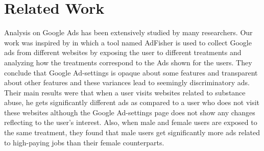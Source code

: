 \documentclass[12pt, journal]{IEEEtran}
\begin{document}
%



\section{Related Work}
Analysis on Google Ads has been extensively studied by many researchers. Our work was inspired by \cite{datta} in which a tool named AdFisher is used to collect Google ads from different websites by exposing the user to different treatments and analyzing how the treatments correspond to the Ads shown for the users. They conclude that Google Ad-settings is opaque about some features and transparent about other features and these variances lead to seemingly discriminatory ads. Their main results were that when a user visits websites related to substance abuse, he gets significantly different ads as compared to a user who does not visit these websites although the Google Ad-settings page does not show any changes reflecting to the user's interest. Also, when male and female users are exposed to the same treatment, they found that male users get significantly more ads related to high-paying jobs than their female counterparts.
\end{document}
